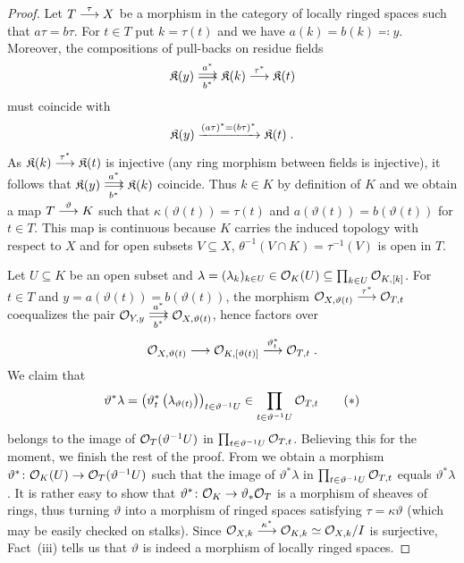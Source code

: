 \documentclass[a4paper,parskip=half,numbers=enddot, DIV=12]{scrreprt}
\begin{document}
\begin{proof}
	Let $T\morphism[\tau]X$ be a morphism in the category of locally ringed spaces such that $a\tau=b\tau$. For $t\in T$ put $k=\tau(t)$ and we have $a(k)=b(k)\eqqcolon y$. Moreover, the compositions of pull-backs on residue fields
	\begin{align*}
		\KK(y)\doublemorphism[\smash{a^*}][\smash{b^*}]\KK(k)\morphism[\tau^*]\KK(t)
	\end{align*}
	must coincide with
	\begin{align*}
		\mathfrak{K}(y)\xrightarrow{(a\tau)^*=(b\tau)^*}\mathfrak{K}(t)\;.
	\end{align*}
	As $\KK(k)\morphism[\tau^*]\KK(t)$ is injective (any ring morphism between fields is injective), it follows that $\KK(y)\doublemorphism[a^*][b^*]\KK(k)$ coincide. Thus $k\in K$ by definition of $K$ and we obtain a map $T\morphism[\vartheta]K$ such that $\kappa(\vartheta(t))=\tau(t)$ and $a(\vartheta(t))=b(\vartheta(t))$ for $t\in T$. This map is continuous because $K$ carries the induced topology with respect to $X$ and for open subsets $V\subseteq X$, $\theta^{-1}(V\cap K)=\tau^{-1}(V)$ is open in $T$.
	
	Let $U\subseteq K$ be an open subset and $\lambda=(\lambda_k)_{k\in U}\in\mathcal{O}_K(U)\subseteq\prod_{k\in U}\mathcal{O}_{K,[k]}$. For $t\in T$ and $y=a(\vartheta(t))=b(\vartheta(t))$, the morphism $\Oo_{X,\vartheta(t)}\morphism[\tau^*]\Oo_{T,t}$ coequalizes the pair $\Oo_{Y,y}\doublemorphism[\smash{a^*}][\smash{b^*}]\Oo_{X,\vartheta(t)}$, hence factors over
	\begin{align*}
		\Oo_{X,\vartheta(t)}\morphism\Oo_{K,[\vartheta(t)]}\morphism[\vartheta^*_t]\Oo_{T,t}\;.
	\end{align*}
	We claim that
	\begin{align}\lbl{eq:bruteForcePullback}
		\vartheta^*\lambda=\left(\vartheta^*_t\left(\lambda_{\vartheta(t)}\right)\right)_{t\in\vartheta^{-1}U}\in\prod_{t\in\vartheta^{-1}U}\Oo_{T,t}\tag{$*$}
	\end{align}
	belongs to the image of $\mathcal{O}_T(\vartheta^{-1}U)$ in $\prod_{t\in\vartheta^{-1}U}\mathcal{O}_{T,t}$. Believing this for the moment, we finish the rest of the proof. From  we obtain a morphism $\vartheta^*\colon\Oo_K(U)\morphism\Oo_T(\vartheta^{-1}U)$ such that the image of $\vartheta^*\lambda$ in $\prod_{t\in\vartheta^{-1}U}\mathcal{O}_{T,t}$ equals $\vartheta^*\lambda$. It is rather easy to show that $\vartheta^*\colon\Oo_K\morphism\vartheta_*\Oo_T$ is a morphism of sheaves of rings, thus turning $\vartheta$ into a morphism of ringed spaces satisfying $\tau=\kappa\vartheta$ (which may be easily checked on stalks). Since $\Oo_{X,k}\morphism[\kappa^*]\Oo_{K,k}\simeq\Oo_{X,k}/I$ is surjective, Fact~(iii) tells us that $\vartheta$ is indeed a morphism of locally ringed spaces.
	

\end{proof}
\end{document}
